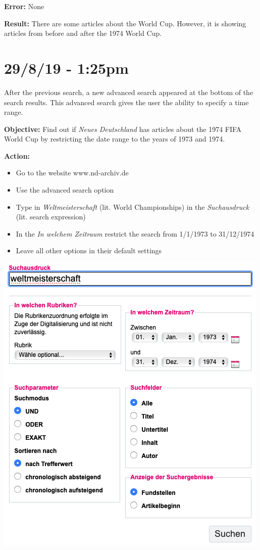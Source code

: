 \documentclass{article}
\begin{document}
\textbf{Error:} None

\textbf{Result:} There are some articles about the World Cup. However, it is showing articles from before and after the 1974 World Cup.

\section*{29/8/19 - 1:25pm}

After the previous search, a new advanced search appeared at the bottom of the search results. This advanced search gives the user the ability to specify a time range.

\textbf{Objective:} Find out if \textit{Neues Deutschland} has articles about the 1974 FIFA World Cup by restricting the date range to the years of 1973 and 1974.

\textbf{Action:}
\begin{itemize}
    \item Go to the website www.nd-archiv.de
    \item Use the advanced search option 
    \item Type in \textit{Weltmeisterschaft} (lit. World Championships) in the \textit{Suchausdruck} (lit. search expression)
    \item In the \textit{In welchem Zeitraum} restrict the search from 1/1/1973 to 31/12/1974
    \item Leave all other options in their default settings
\end{itemize}

\includegraphics[width=\textwidth]{nd_search.png}
\end{document}
